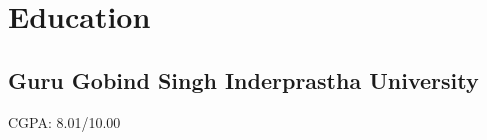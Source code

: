 \documentclass[]{deedy-resume-openfont}
\begin{document}
\begin{minipage}[t]{0.25\textwidth}

\section{Education} 

\subsection{Guru Gobind Singh Inderprastha \linebreak University}
CGPA: 8.01/10.00
\sectionsep

%
%

\end{minipage}
\hfill
\end{document}
